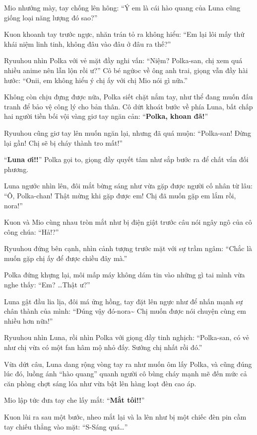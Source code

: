 \documentclass[../main.tex]{subfiles}
\begin{document}
Mio nhướng mày, tay chống lên hông: ``Ý em là cái hào quang của Luna cũng giống loại năng lượng đó sao?''

Kuon khoanh tay trước ngực, nhăn trán tỏ ra không hiểu: ``Em lại lôi mấy thứ khái niệm linh tinh, không đâu vào đâu ở đâu ra thế?''

Ryuuhou nhìn Polka với vẻ mặt đầy nghi vấn: ``Niệm? Polka-san, chị xem quá nhiều anime nên lẫn lộn rồi ư?'' Cô bé ngứoc về ông anh trai, giọng vẫn đầy hài hước: ``Onii, em không hiểu ý chị ấy với chị Mio nói gì nữa.''

Không còn chịu đựng được nữa, Polka siết chặt nắm tay, như thể đang muốn đấu tranh để bảo vệ công lý cho bản thân. Cô dứt khoát bước về phía Luna, bất chấp hai người tiền bối vội vàng giơ tay ngăn cản: ``\textbf{Polka, khoan đã!}''

Ryuuhou cũng giơ tay lên muốn ngăn lại, nhưng đã quá muộn: ``Polka-san! Đừng lại gần! Chị sẽ bị cháy thành tro mất!''

``\textbf{Luna ơi!!}'' Polka gọi to, giọng đầy quyết tâm như sắp bước ra để chất vấn đối phương.

Luna ngước nhìn lên, đôi mắt bừng sáng như vừa gặp được người cố nhân từ lâu: ``Ô, Polka-chan! Thật mừng khi gặp được em! Chị đã muốn gặp em lắm rồi, nora!''

Kuon và Mio cùng nhau tròn mắt như bị điện giật trước câu nói ngây ngô của cô công chúa: ``Hả!?''

Ryuuhou đứng bên cạnh, nhìn cảnh tượng trước mặt với sự trầm ngâm: ``Chắc là muốn gặp chị ấy để được chiều đây mà.''

Polka đứng khựng lại, môi mấp máy không dám tin vào những gì tai mình vừa nghe thấy: ``Em? \dots Thật ư?''

Luna gật đầu lia lịa, đôi má ửng hồng, tay đặt lên ngực như để nhấn mạnh sự chân thành của mình: ``Đúng vậy đó-nora\~{} Chị muốn được nói chuyện cùng em nhiều hơn nữa!''

Ryuuhou nhìn Luna, rồi nhìn Polka với giọng đầy tinh nghịch: ``Polka-san, có vẻ như chị vừa có một fan hâm mộ nhỏ đấy. Sướng chị nhất rồi đó.''

Vừa dứt câu, Luna dang rộng vòng tay ra như muốn ôm lấy Polka, và cũng đúng lúc đó, luồng ánh ``hào quang'' quanh người cô bùng cháy mạnh mẽ đến mức cả căn phòng chợt sáng lóa như vừa bật lên hàng loạt đèn cao áp.

Mio lập tức đưa tay che lấy mắt: ``\textbf{Mắt tôi!!}''

Kuon lùi ra sau một bước, nheo mắt lại và la lên như bị một chiếc đèn pin cầm tay chiếu thẳng vào mặt: ``S-Sáng quá\dots''
\end{document}
